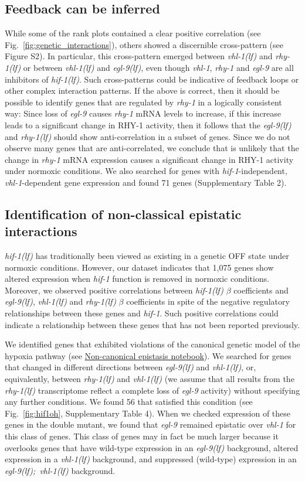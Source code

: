 \documentclass[9pt,twocolumn,twoside]{pnas-new}
\newcommand{\gene}[1]{\mbox{\emph{#1}}}
\newcommand{\egl}{\gene{egl-9(lf)}}
\newcommand{\rhy}{\gene{rhy-1(lf)}}
\newcommand{\vhl}{\gene{vhl-1(lf)}}
\newcommand{\eglvhl}{\gene{egl-9(lf); vhl-1(lf)}}
\newcommand{\hif}{\gene{hif-1(lf)}}
\newcommand{\hifn}{1,075}
\newcommand{\vhltargets}{71} %
\newcommand{\hifohtargets}{56}
\begin{document}
\subsection*{Feedback can be inferred}
\label{sub:topology}
While some of the rank plots contained a clear positive correlation (see
Fig.~\ref{fig:genetic_interactions}), others showed a discernible cross-pattern
(see Figure S2). In particular, this cross-pattern emerged between \vhl{} and
\rhy{} or between \vhl{} and \egl{}, even though \gene{vhl-1}, \gene{rhy-1} and
\gene{egl-9} are all inhibitors of \hif{}. Such cross-patterns could be
indicative of feedback loops or other complex interaction patterns. If the above
is correct, then it should be possible to identify genes that are regulated by
\gene{rhy-1} in a logically consistent way: Since loss of \gene{egl-9} causes
\gene{rhy-1} mRNA levels to increase, if this increase leads to a significant
change in RHY-1 activity, then it follows that the \egl{} and \rhy{} should show
anti-correlation in a subset of genes. Since we do not observe many genes that
are anti-correlated, we conclude that is unlikely that the change in
\gene{rhy-1} mRNA expression causes a significant change in RHY-1 activity under
normoxic conditions. We also searched for genes with \gene{hif-1}-independent,
\gene{vhl-1}-dependent gene expression and found \vhltargets{} genes
(Supplementary Table 2).

\subsection*{Identification of non-classical epistatic interactions}
\label{sub:hifoh}
\hif{} has traditionally been viewed as existing in a genetic OFF state under
normoxic conditions. However, our dataset indicates that \hifn{} genes show
altered expression when \gene{hif-1} function is removed in normoxic conditions.
Moreover, we observed positive correlations between \hif{} $\beta$ coefficients
and \egl{}, \vhl{} and \rhy{} $\beta$ coefficients in spite of the negative
regulatory relationships between these genes and \gene{hif-1}. Such positive
correlations could indicate a relationship between these genes that has not
been reported previously.

We identified genes that exhibited violations of the canonical genetic
model of the hypoxia pathway (see
\href{https://wormlabcaltech.github.io/mprsq/analysis_notebooks/7_hifoh.html}
{Non-canonical epistasis notebook}). We searched for genes that changed in different
directions between \egl{} and \vhl{}, or, equivalently, between \rhy{} and
\vhl{} (we assume that all results from the \rhy{} transcriptome reflect a
complete loss of \gene{egl-9} activity) without specifying any further
conditions. We found \hifohtargets{} that satisfied this condition (see
Fig.~\ref{fig:hif1oh}, Supplementary Table 4). When we checked expression of
these genes in the double mutant, we found that \gene{egl-9} remained epistatic
over \gene{vhl-1} for this class of genes. This class of genes may in fact be
much larger because it overlooks genes that have wild-type expression in an
\egl{} background, altered expression in a \vhl{} background, and suppressed
(wild-type) expression  in an \eglvhl{} background.
\end{document}
